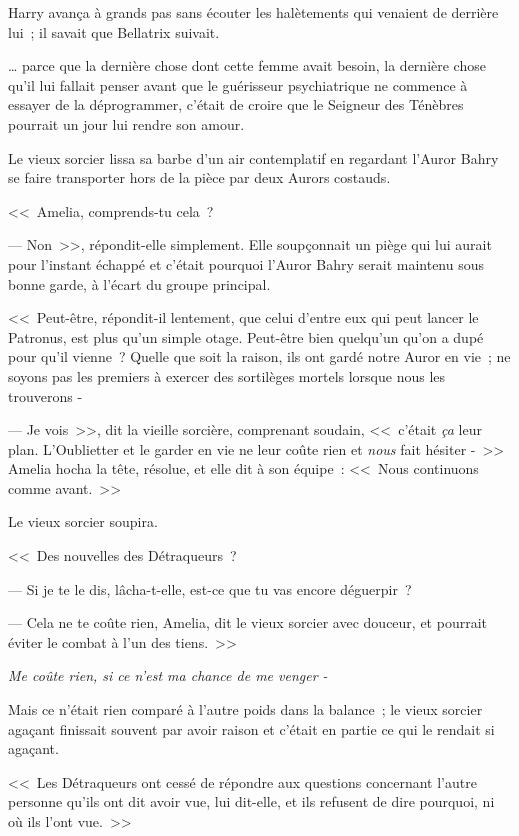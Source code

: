 Harry avança à grands pas sans écouter les halètements qui venaient de derrière lui~; il savait que Bellatrix suivait.

… parce que la dernière chose dont cette femme avait besoin, la dernière chose qu'il lui fallait penser avant que le guérisseur psychiatrique ne commence à essayer de la déprogrammer, c'était de croire que le Seigneur des Ténèbres pourrait un jour lui rendre son amour.

\later

Le vieux sorcier lissa sa barbe d'un air contemplatif en regardant l'Auror Bahry se faire transporter hors de la pièce par deux Aurors costauds.

<<~Amelia, comprends-tu cela~?

--- Non~>>, répondit-elle simplement. Elle soupçonnait un piège qui lui aurait pour l'instant échappé et c'était pourquoi l'Auror Bahry serait maintenu sous bonne garde, à l'écart du groupe principal.

<<~Peut-être, répondit-il lentement, que celui d'entre eux qui peut lancer le Patronus, est plus qu'un simple otage. Peut-être bien quelqu'un qu'on a dupé pour qu'il vienne~? Quelle que soit la raison, ils ont gardé notre Auror en vie~; ne soyons pas les premiers à exercer des sortilèges mortels lorsque nous les trouverons -

--- Je vois~>>, dit la vieille sorcière, comprenant soudain, <<~c'était \emph{ça} leur plan. L'Oublietter et le garder en vie ne leur coûte rien et \emph{nous} fait hésiter -~>> Amelia hocha la tête, résolue, et elle dit à son équipe~: <<~Nous continuons comme avant.~>>

Le vieux sorcier soupira.

<<~Des nouvelles des Détraqueurs~?

--- Si je te le dis, lâcha-t-elle, est-ce que tu vas encore déguerpir~?

--- Cela ne te coûte rien, Amelia, dit le vieux sorcier avec douceur, et pourrait éviter le combat à l'un des tiens.~>>

\emph{Me coûte rien, si ce n'est ma chance de me venger -}

Mais ce n'était rien comparé à l'autre poids dans la balance~; le vieux sorcier agaçant finissait souvent par avoir raison et c'était en partie ce qui le rendait si agaçant.

<<~Les Détraqueurs ont cessé de répondre aux questions concernant l'autre personne qu'ils ont dit avoir vue, lui dit-elle, et ils refusent de dire pourquoi, ni où ils l'ont vue.~>>

